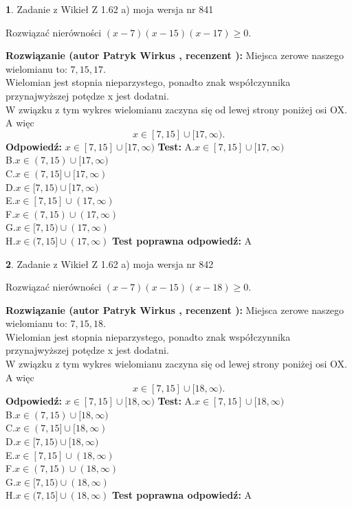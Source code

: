 \documentclass[12pt, a4paper]{article}
\theoremstyle{definition} %
\newtheorem{zad}{}
\newcommand{\zadStart}[1]{\begin{zad}#1\newline}
\newcommand{\zadStop}{\end{zad}}
\newcommand{\rozwStart}[2]{\noindent \textbf{Rozwiązanie (autor #1 , recenzent #2): }\newline}
\newcommand{\rozwStop}{\newline}
\newcommand{\odpStart}{\noindent \textbf{Odpowiedź:}\newline}
\newcommand{\odpStop}{\newline}
\newcommand{\testStart}{\noindent \textbf{Test:}\newline}
\newcommand{\testStop}{\newline}
\newcommand{\kluczStart}{\noindent \textbf{Test poprawna odpowiedź:}\newline}
\newcommand{\kluczStop}{\newline}
\begin{document}
\zadStart{Zadanie z Wikieł Z 1.62 a) moja wersja nr 841}

Rozwiązać nierówności $(x-7)(x-15)(x-17)\ge0$.
\zadStop
\rozwStart{Patryk Wirkus}{}
Miejsca zerowe naszego wielomianu to: $7, 15, 17$.\\
Wielomian jest stopnia nieparzystego, ponadto znak współczynnika przy\linebreak najwyższej potędze x jest dodatni.\\ W związku z tym wykres wielomianu zaczyna się od lewej strony poniżej osi OX. A więc $$x \in [7,15] \cup [17,\infty).$$
\rozwStop
\odpStart
$x \in [7,15] \cup [17,\infty)$
\odpStop
\testStart
A.$x \in [7,15] \cup [17,\infty)$\\
B.$x \in (7,15) \cup [17,\infty)$\\
C.$x \in (7,15] \cup [17,\infty)$\\
D.$x \in [7,15) \cup [17,\infty)$\\
E.$x \in [7,15] \cup (17,\infty)$\\
F.$x \in (7,15) \cup (17,\infty)$\\
G.$x \in [7,15) \cup (17,\infty)$\\
H.$x \in (7,15] \cup (17,\infty)$
\testStop
\kluczStart
A
\kluczStop



\zadStart{Zadanie z Wikieł Z 1.62 a) moja wersja nr 842}

Rozwiązać nierówności $(x-7)(x-15)(x-18)\ge0$.
\zadStop
\rozwStart{Patryk Wirkus}{}
Miejsca zerowe naszego wielomianu to: $7, 15, 18$.\\
Wielomian jest stopnia nieparzystego, ponadto znak współczynnika przy\linebreak najwyższej potędze x jest dodatni.\\ W związku z tym wykres wielomianu zaczyna się od lewej strony poniżej osi OX. A więc $$x \in [7,15] \cup [18,\infty).$$
\rozwStop
\odpStart
$x \in [7,15] \cup [18,\infty)$
\odpStop
\testStart
A.$x \in [7,15] \cup [18,\infty)$\\
B.$x \in (7,15) \cup [18,\infty)$\\
C.$x \in (7,15] \cup [18,\infty)$\\
D.$x \in [7,15) \cup [18,\infty)$\\
E.$x \in [7,15] \cup (18,\infty)$\\
F.$x \in (7,15) \cup (18,\infty)$\\
G.$x \in [7,15) \cup (18,\infty)$\\
H.$x \in (7,15] \cup (18,\infty)$
\testStop
\kluczStart
A
\kluczStop
\end{document}
